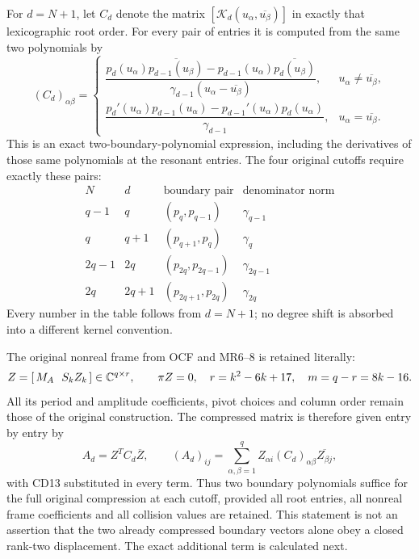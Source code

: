\documentclass[11pt]{article}
\begin{document}
For \(d=N+1\), let \(C_d\) denote the matrix
\([\mathcal K_d(u_\alpha,\overline{u_\beta})]\) in exactly that
lexicographic root order. For every pair of entries it is computed from
the same two polynomials by
\begin{equation}\label{cdroot:eq:entry-recipe}
 (C_d)_{\alpha\beta}=
 \begin{cases}
 \dfrac{p_d(u_\alpha)\overline{p_{d-1}(u_\beta)}-
 p_{d-1}(u_\alpha)\overline{p_d(u_\beta)}}
 {\gamma_{d-1}(u_\alpha-\overline{u_\beta})},
 &u_\alpha\ne\overline{u_\beta},\\[7pt]
 \dfrac{p_d'(u_\alpha)p_{d-1}(u_\alpha)-
 p_{d-1}'(u_\alpha)p_d(u_\alpha)}{\gamma_{d-1}},
 &u_\alpha=\overline{u_\beta}.
 \end{cases}
 \tag{CD13}
\end{equation}
This is an exact two-boundary-polynomial expression, including the
derivatives of those same polynomials at the resonant entries.
The four original cutoffs require exactly these pairs:
\[
\begin{array}{c|c|c|c}
N&d&\text{boundary pair}&\text{denominator norm}\\\hline
q-1&q&(p_q,p_{q-1})&\gamma_{q-1}\\
q&q+1&(p_{q+1},p_q)&\gamma_q\\
2q-1&2q&(p_{2q},p_{2q-1})&\gamma_{2q-1}\\
2q&2q+1&(p_{2q+1},p_{2q})&\gamma_{2q}
\end{array}
 \tag{CD14}
\]
Every number in the table follows from \(d=N+1\); no degree shift is
absorbed into a different kernel convention.

The original nonreal frame from OCF and MR6--8 is retained literally:
\[
 Z=[\,M_A\ \ S_kZ_k\,]\in\mathbb C^{q\times r},\qquad
 \pi Z=0,\quad r=k^2-6k+17,
 \quad m=q-r=8k-16.
\]
All its period and amplitude coefficients, pivot choices and column
order remain those of the original construction. The compressed matrix
is therefore given entry by entry by
\begin{equation}\label{cdroot:eq:compression-recipe}
 A_d=Z^TC_d\overline Z,
 \qquad
 (A_d)_{ij}=\sum_{\alpha,\beta=1}^q
    Z_{\alpha i}(C_d)_{\alpha\beta}\overline{Z_{\beta j}},
 \tag{CD15}
\end{equation}
with CD13 substituted in every term. Thus two boundary polynomials
suffice for the full original compression at each cutoff, provided all
root entries, all nonreal frame coefficients and all collision values
are retained. This statement is not an assertion that the two already
compressed boundary vectors alone obey a closed rank-two displacement.
The exact additional term is calculated next.
\end{document}
